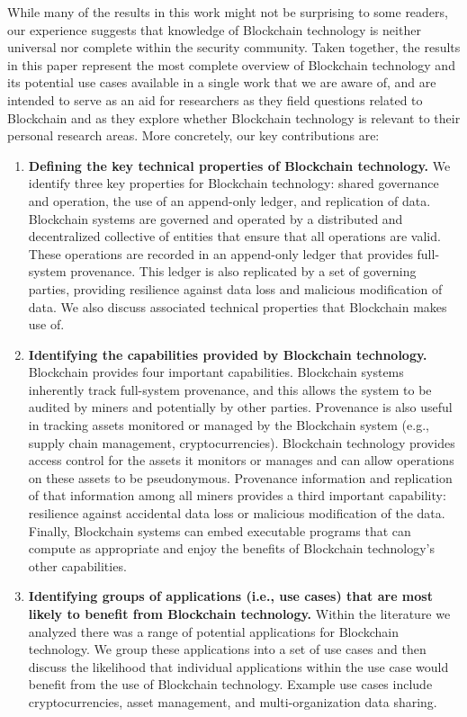 While many of the results in this work might not be surprising to some readers, our experience suggests that knowledge of Blockchain technology is neither universal nor complete within the security community.
Taken together, the results in this paper represent the most complete overview of Blockchain technology and its potential use cases available in a single work that we are aware of, and are intended to serve as an aid for researchers as they field questions related to Blockchain and as they explore whether Blockchain technology is relevant to their personal research areas. More concretely, our key contributions are:

\begin{enumerate}
	\item \textbf{Defining the key technical properties of Blockchain technology.}
	We identify three key properties for Blockchain technology: shared governance and operation, the use of an append-only ledger, and replication of data.
	Blockchain systems are governed and operated by a distributed and decentralized collective of entities that ensure that all operations are valid.
	These operations are recorded in an append-only ledger that provides full-system provenance.
	This ledger is also replicated by a set of governing parties, providing resilience against data loss and malicious modification of data.
	We also discuss associated technical properties that Blockchain makes use of.
	
	\item \textbf{Identifying the capabilities provided by Blockchain technology.}
 	Blockchain provides four important capabilities.
	Blockchain systems inherently track full-system provenance, and this allows the system to be audited by miners and potentially by other parties.
	Provenance is also useful in tracking assets monitored or managed by the Blockchain system (e.g., supply chain management, cryptocurrencies).
	Blockchain technology provides access control for the assets it monitors or manages and can allow operations on these assets to be pseudonymous.
	Provenance information and replication of that information among all miners provides a third important capability: resilience against accidental data loss or malicious modification of the data.
	Finally, Blockchain systems can embed executable programs that can compute as appropriate and enjoy the benefits of Blockchain technology's other capabilities.
	
	\item \textbf{Identifying groups of applications (i.e., use cases) that are most likely to benefit from Blockchain technology.}
	Within the literature we analyzed there was a range of potential applications for Blockchain technology.
	We group these applications into a set of use cases and then discuss the likelihood that individual applications within the use case would benefit from the use of Blockchain technology.
	Example use cases include cryptocurrencies, asset management, and multi-organization data sharing.
	

\end{enumerate}
